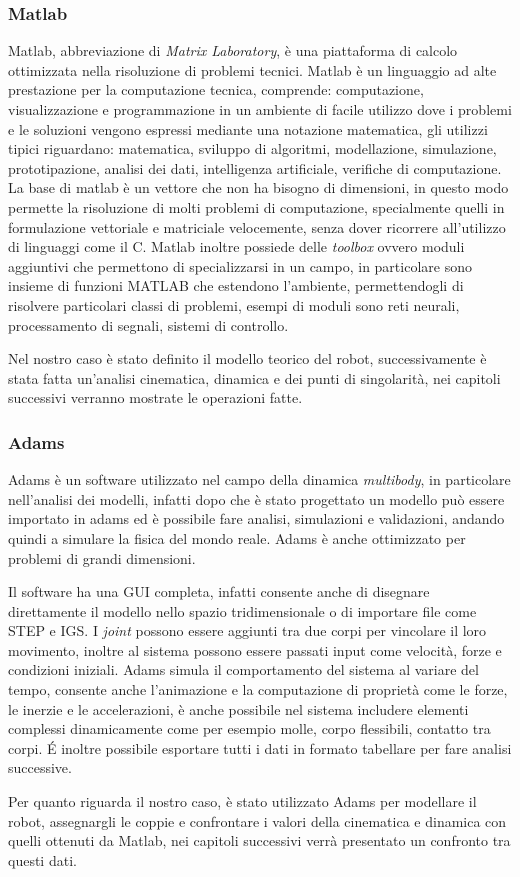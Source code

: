\subsubsection{Matlab}
Matlab, abbreviazione di \textit{Matrix Laboratory}, è una piattaforma di calcolo ottimizzata nella risoluzione di problemi tecnici. 
Matlab è un linguaggio ad alte prestazione per la computazione tecnica, comprende: computazione, visualizzazione e programmazione in un ambiente di facile utilizzo dove i problemi e le soluzioni vengono espressi mediante una notazione matematica, gli utilizzi tipici riguardano: matematica, sviluppo di algoritmi, modellazione, simulazione, prototipazione, analisi dei dati, intelligenza artificiale, verifiche di computazione. La base di matlab è un vettore che non ha bisogno di dimensioni, in questo modo permette la risoluzione di molti problemi di computazione, specialmente quelli in formulazione vettoriale e matriciale velocemente, senza dover ricorrere all'utilizzo di linguaggi come il C. Matlab inoltre possiede delle \textit{toolbox} ovvero moduli aggiuntivi che permettono di specializzarsi in un campo, in particolare sono insieme di funzioni MATLAB che estendono l'ambiente, permettendogli di risolvere particolari classi di problemi, esempi di moduli sono reti neurali, processamento di segnali, sistemi di controllo.
\par Nel nostro caso è stato definito il modello teorico del robot, successivamente è stata fatta un'analisi cinematica, dinamica e dei punti di singolarità, nei capitoli successivi verranno mostrate le operazioni fatte. 
\subsubsection{Adams}
Adams è un software utilizzato nel campo della dinamica \textit{multibody}, in particolare nell'analisi dei modelli, infatti dopo che è stato progettato un modello può essere importato in adams ed è possibile fare analisi, simulazioni e validazioni, andando quindi a simulare la fisica del mondo reale. Adams è anche ottimizzato per problemi di grandi dimensioni.
\par Il software ha una GUI completa, infatti consente anche di disegnare direttamente il modello nello spazio tridimensionale o di importare file come STEP e IGS. I \textit{joint} possono essere aggiunti tra due corpi per vincolare il loro movimento, inoltre al sistema possono essere passati input come velocità, forze e condizioni iniziali. Adams simula il comportamento del sistema al variare del tempo, consente anche l'animazione e la computazione di proprietà come le forze, le inerzie e le accelerazioni, è anche possibile nel sistema includere elementi complessi dinamicamente come per esempio molle, corpo flessibili, contatto tra corpi.
É inoltre possibile esportare tutti i dati in formato tabellare per fare analisi successive. 
\par Per quanto riguarda il nostro caso, è stato utilizzato Adams per modellare il robot, assegnargli le coppie e confrontare i valori della cinematica e dinamica con quelli ottenuti da Matlab, nei capitoli successivi verrà presentato un confronto tra questi dati.